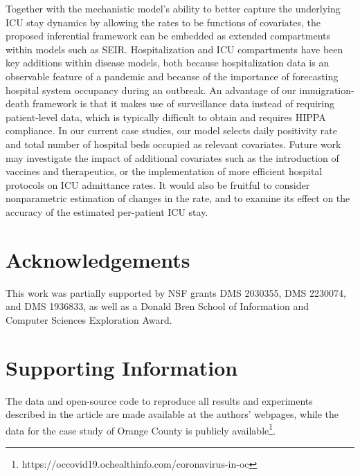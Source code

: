 \documentclass{article}
\newcommand{\achal}[1]{{\color{black}{ #1}}}
\begin{document}
Together with the mechanistic model's ability to better capture the underlying ICU stay dynamics by allowing the rates to be functions of covariates, the proposed inferential framework can be embedded as extended compartments within models such as SEIR.\cite{bu2021likelihood} Hospitalization and ICU compartments have been key additions within disease models, both because hospitalization data is an observable feature of a pandemic and because of the importance of forecasting hospital system occupancy during an outbreak.\cite{van2020forecasting, morozova2020model} An advantage of our immigration-death framework is that it makes use of surveillance data instead of requiring patient-level data, which is typically difficult to obtain and requires HIPPA compliance. In our current case studies, our model selects daily positivity rate and total number of hospital beds occupied as relevant covariates. Future work may investigate the impact of additional covariates such as the introduction of vaccines and therapeutics, or the implementation of more efficient hospital protocols on ICU admittance rates.\achal{The availability of data at the hospital level may allow us to incorporate covariates that stratify the risk by hospitals and use techniques from survival analysis to extend our model framework.} It would also be fruitful to consider nonparametric estimation of changes in the\achal{clearance} rate, and to examine its effect on the accuracy of the estimated per-patient ICU stay.

\pagebreak


\section*{Acknowledgements}
This work was partially supported by NSF grants DMS 2030355, DMS 2230074, and DMS 1936833, as well as a Donald Bren School of Information and Computer Sciences Exploration Award.

  


\section*{Supporting Information}
The data and open-source code to reproduce all results and experiments described in the article are made available at the authors' webpages, 
while the data for the case study of Orange County is publicly available\footnote{https://occovid19.ochealthinfo.com/coronavirus-in-oc}.
\end{document}

